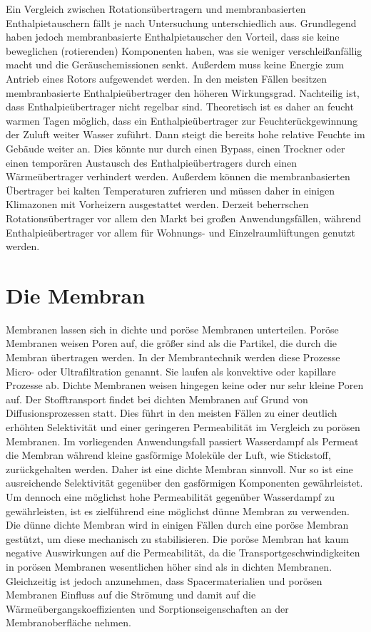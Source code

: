 Ein Vergleich zwischen Rotationsübertragern und membranbasierten Enthalpietauschern fällt je nach Untersuchung unterschiedlich aus. Grundlegend haben jedoch membranbasierte Enthalpietauscher den Vorteil, dass sie keine beweglichen (rotierenden) Komponenten haben, was sie weniger verschleißanfällig macht und die Geräuschemissionen senkt. Außerdem muss keine Energie zum Antrieb eines Rotors aufgewendet werden. In den meisten Fällen besitzen membranbasierte Enthalpieübertrager den höheren Wirkungsgrad. \cite{JustoAlonso.2015}  %
Nachteilig ist, dass Enthalpieübertrager nicht regelbar sind. Theoretisch
ist es daher an feucht warmen Tagen möglich, dass ein Enthalpieübertrager zur Feuchterückgewinnung der Zuluft weiter Wasser zuführt. Dann steigt die bereits hohe relative Feuchte im Gebäude weiter an. Dies könnte nur durch einen Bypass, einen Trockner oder einen temporären Austausch des Enthalpieübertragers durch einen Wärmeübertrager verhindert werden. Außerdem können die membranbasierten Übertrager bei kalten Temperaturen zufrieren und müssen daher in einigen Klimazonen mit Vorheizern ausgestattet werden. Derzeit beherrschen Rotationsübertrager vor allem den Markt bei großen Anwendungsfällen, während Enthalpieübertrager vor allem für Wohnungs- und Einzelraumlüftungen genutzt werden.  


\section{Die Membran}

Membranen lassen sich in dichte und poröse Membranen unterteilen. 
Poröse Membranen weisen Poren auf, die größer sind als die Partikel, die durch die Membran übertragen werden. In der Membrantechnik werden diese Prozesse Micro- oder Ultrafiltration genannt. Sie laufen als konvektive oder kapillare Prozesse ab. 
Dichte Membranen weisen hingegen keine oder nur sehr kleine Poren auf.  Der Stofftransport findet bei dichten Membranen auf Grund von Diffusionsprozessen statt. 
Dies führt in den meisten Fällen zu einer deutlich erhöhten Selektivität und einer geringeren Permeabilität im Vergleich zu porösen Membranen. Im vorliegenden Anwendungsfall passiert Wasserdampf als Permeat die Membran während kleine gasförmige Moleküle der Luft, wie Stickstoff, zurückgehalten werden. Daher ist eine dichte Membran sinnvoll. Nur so ist eine ausreichende Selektivität gegenüber den gasförmigen Komponenten gewährleistet. \cite{ThomasMelin.2007}
Um dennoch eine möglichst hohe Permeabilität gegenüber Wasserdampf zu gewährleisten, ist es zielführend eine möglichst dünne Membran zu verwenden. 
Die dünne dichte Membran wird in einigen Fällen durch eine poröse Membran gestützt, um diese mechanisch zu stabilisieren. Die poröse Membran hat kaum negative Auswirkungen auf die Permeabilität, da die Transportgeschwindigkeiten in porösen Membranen wesentlichen höher sind als in dichten Membranen. Gleichzeitig ist jedoch anzunehmen, dass Spacermaterialien und porösen Membranen Einfluss auf die Strömung und damit auf die Wärmeübergangskoeffizienten und Sorptionseigenschaften an der Membranoberfläche nehmen. \cite{Shrivastava.2008}  %

